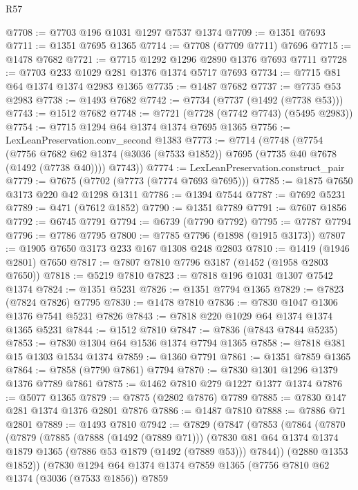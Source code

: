 \begin{lexlean}{R57}
\begin{coremodule}
@7708 := @7703 @196 @1031 @1297 @7537 @1374
@7709 := @1351 @7693
@7711 := @1351 @7695 @1365
@7714 := @7708 (@7709 @7711) @7696
@7715 := @1478 @7682
@7721 := @7715 @1292 @1296 @2890 @1376 @7693 @7711
@7728 := @7703 @233 @1029 @281 @1376 @1374 @5717 @7693
@7734 := @7715 @81 @64 @1374 @1374 @2983 @1365
@7735 := @1487 @7682
@7737 := @7735 @53 @2983
@7738 := @1493 @7682
@7742 := @7734 (@7737 (@1492 (@7738 @53)))
@7743 := @1512 @7682
@7748 := @7721 (@7728 (@7742 @7743) (@5495 @2983))
@7754 := @7715 @1294 @64 @1374 @1374 @7695 @1365
@7756 := LexLeanPreservation.conv_second @1383
@7773 := @7714
    (@7748
      (@7754
        (@7756 @7682 @62 @1374 (@3036 (@7533 @1852)) @7695 (@7735 @40 @7678 (@1492 (@7738 @40))))
        @7743))
@7774 := LexLeanPreservation.construct_pair
@7779 := @7675 (@7702 (@7773 (@7774 @7693 @7695)))
@7785 := @1875 @7650 @3173 @220 @42 @1298 @1311
@7786 := @1394 @7544
@7787 := @7692 @5231
@7789 := @471 (@7612 @1852)
@7790 := @1351 @7789
@7791 := @7607 @1856
@7792 := @6745 @7791
@7794 := @6739 (@7790 @7792)
@7795 := @7787 @7794
@7796 := @7786 @7795
@7800 := @7785 @7796 (@1898 (@1915 @3173))
@7807 := @1905 @7650 @3173 @233 @167 @1308 @248 @2803
@7810 := @1419 (@1946 @2801) @7650
@7817 := @7807 @7810 @7796 @3187 (@1452 (@1958 @2803 @7650))
@7818 := @5219 @7810
@7823 := @7818 @196 @1031 @1307 @7542 @1374
@7824 := @1351 @5231
@7826 := @1351 @7794 @1365
@7829 := @7823 (@7824 @7826) @7795
@7830 := @1478 @7810
@7836 := @7830 @1047 @1306 @1376 @7541 @5231 @7826
@7843 := @7818 @220 @1029 @64 @1374 @1374 @1365 @5231
@7844 := @1512 @7810
@7847 := @7836 (@7843 @7844 @5235)
@7853 := @7830 @1304 @64 @1536 @1374 @7794 @1365
@7858 := @7818 @381 @15 @1303 @1534 @1374
@7859 := @1360 @7791
@7861 := @1351 @7859 @1365
@7864 := @7858 (@7790 @7861) @7794
@7870 := @7830 @1301 @1296 @1379 @1376 @7789 @7861
@7875 := @1462 @7810 @279 @1227 @1377 @1374
@7876 := @5077 @1365
@7879 := @7875 (@2802 @7876) @7789
@7885 := @7830 @147 @281 @1374 @1376 @2801 @7876
@7886 := @1487 @7810
@7888 := @7886 @71 @2801
@7889 := @1493 @7810
@7942 := @7829
    (@7847
      (@7853
        (@7864
          (@7870
            (@7879
              (@7885
                (@7888 (@1492 (@7889 @71)))
                (@7830 @81 @64 @1374 @1374 @1879 @1365 (@7886 @53 @1879 (@1492 (@7889 @53))) @7844))
              (@2880 @1353 @1852))
            (@7830
              @1294
              @64
              @1374
              @1374
              @7859
              @1365
              (@7756
                @7810
                @62
                @1374
                (@3036 (@7533 @1856))
                @7859

\end{coremodule}
\end{lexlean}
